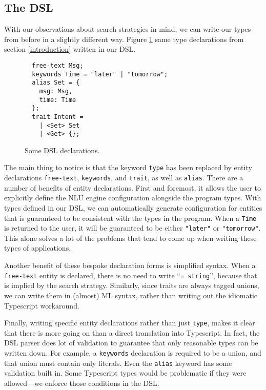 \documentclass[twocolumn]{article}
\newcommand{\ts}[1]{\texttt{#1}}
\begin{document}
\subsection{The DSL}
With our observations about search strategies in mind, we can write our types
from before in a slightly different way. Figure \ref{fig:dsl_decls} same type
declarations from section \ref{introduction} written in our DSL.

\begin{figure}
\begin{verbatim}
  free-text Msg;
  keywords Time = "later" | "tomorrow";
  alias Set = {
    msg: Msg,
    time: Time
  };
  trait Intent =
    | <Set> Set
    | <Get> {};
\end{verbatim}
  \caption{Some DSL declarations.}
  \label{fig:dsl_decls}
\end{figure}

The main thing to notice is that the keyword \ts{type} has been replaced by
entity declarations \ts{free-text}, \ts{keywords}, and \ts{trait}, as well as
\ts{alias}. There are a number of benefits of entity declarations. First and
foremost, it allows the user to explicitly define the NLU engine configuration
alongside the program types. With types defined in our DSL, we can automatically
generate configuration for entities that is guaranteed to be consistent with the
types in the program. When a \ts{Time} is returned to the user, it will be
guaranteed to be either \ts{"later"} or \ts{"tomorrow"}. This alone solves a lot
of the problems that tend to come up when writing these types of applications.

Another benefit of these bespoke declaration forms is simplified syntax. When a
\ts{free-text} entity is declared, there is no need to write ``\ts{= string}'',
because that is implied by the search strategy. Similarly, since traits are
always tagged unions, we can write them in (almost) ML syntax, rather than
writing out the idiomatic Typescript workaround.

Finally, writing specific entity declarations rather than just \ts{type}, makes
it clear that there is more going on than a direct translation into Typescript.
In fact, the DSL parser does lot of validation to guarantee that only reasonable
types can be written down. For example, a \ts{keywords} declaration is required
to be a union, and that union must contain only literals. Even the \ts{alias}
keyword has some validation built in. Some Typescript types would be problematic
if they were allowed---we enforce those conditions in the DSL.
\end{document}
